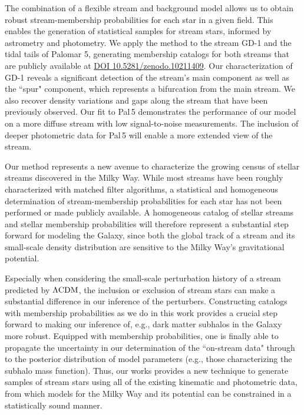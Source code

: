 \documentclass[twocolumn, linenumbers]{aastex631}
\newcommand{\stream}[1]{#1}
\begin{document}
    The combination of a flexible stream and background model allows us to
    obtain robust stream-membership probabilities for each star in a given
    field. This enables the generation of statistical samples for stream stars,
    informed by astrometry and photometry. We apply the method to the stream
    \stream{GD-1} and the tidal tails of \stream{Palomar 5}, generating
    membership catalogs for both streams that are publicly available at
    \href{https://zenodo.org/doi/10.5281/zenodo.10903751}{DOI 10.5281/zenodo.10211409}. Our
    characterization of \stream{GD-1} reveals a significant detection of the
    stream's main component as well as the ``spur" component, which represents a
    bifurcation from the main stream.  We also recover density variations and
    gaps along the stream that have been previously observed. Our fit to
    \stream{Pal\,5} demonstrates the performance of our model on a more diffuse
    stream with low signal-to-noise measurements.  The inclusion of deeper
    photometric data for \stream{Pal\,5} will enable a more extended view of the
    stream.
    
    
    Our method represents a new avenue to characterize the growing census of
    stellar streams discovered in the Milky Way. While most streams have been
    roughly characterized with matched filter algorithms, a statistical and
    homogeneous determination of stream-membership probabilities for each star
    has not been performed or made publicly available. A homogeneous catalog of
    stellar streams and stellar membership probabilities will therefore
    represent a substantial step forward for modeling the Galaxy, since both the
    global track of a stream and its small-scale density distribution are
    sensitive to the Milky Way's gravitational potential. 
    
    Especially when considering the small-scale perturbation history of a stream
    predicted by $\Lambda\rm{CDM}$, the inclusion or exclusion of stream stars
    can make a substantial difference in our inference of the perturbers.
    Constructing catalogs with membership probabilities as we do in this work
    provides a crucial step forward to making our inference of, e.g., dark
    matter subhalos in the Galaxy more robust. Equipped with membership
    probabilities, one is finally able to propagate the uncertainty in our
    determination of the ``on-stream data" through to the posterior distribution
    of model parameters (e.g., those characterizing the subhalo mass function).
    Thus, our works provides a new technique to generate samples of stream stars
    using all of the existing kinematic and photometric data, from which models
    for the Milky Way and its potential can be constrained in a statistically
    sound manner.
\end{document}

